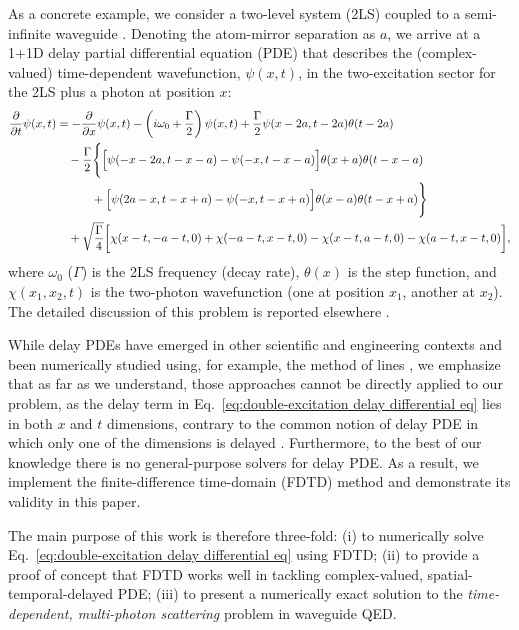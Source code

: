 \documentclass[12pt,letter,onecolumn,notitlepage]{article}
\begin{document}
As a concrete example, we consider a two-level system (2LS) coupled to a semi-infinite waveguide \cite{FangPRA15, FangNM17}. Denoting the atom-mirror separation as $a$, we arrive at a 1+1D delay partial differential equation (PDE) that describes the (complex-valued) time-dependent wavefunction, $\psi(x,t)$, in the two-excitation sector for the 2LS plus a photon at position $x$:
\begin{align}
\frac{\partial}{\partial t}\psi(x,t)&=-\frac{\partial}{\partial x}\psi(x,t)-\left(i\omega_0+\frac{\Gamma}{2}\right)\psi(x,t)+\frac{\Gamma}{2}\psi(x-2a, t-2a)\theta(t-2a)  \label{eq:double-excitation delay differential eq}\\
&\quad- \frac{\Gamma}{2}\Biggl\{\Bigl[\psi(- x- 2a, t- x- a) - \psi(- x, t- x- a)\Bigr]\theta(x+a)\theta(t- x- a)\nonumber\\
&\quad\quad\quad +\Bigl[\psi(2a- x, t- x+ a)- \psi(- x, t- x+a)\Bigr]\theta(x- a)\theta(t- x+ a)\Biggr\} \nonumber\\
&\quad+\sqrt{\frac{\Gamma}{4}}\biggl[\chi(x-t,-a-t,0)+\chi(-a-t,x-t,0)-\chi(x-t,a-t,0)-\chi(a-t,x-t,0)\biggr]\nonumber,
\end{align}
where $\omega_0$ ($\Gamma$) is the 2LS frequency (decay rate), $\theta(x)$ is the step function, and $\chi(x_1, x_2,t )$ is the two-photon wavefunction (one at position $x_1$, another at $x_2$). The detailed discussion of this problem is reported elsewhere \cite{FangNM17}.

While delay PDEs have emerged in other scientific and engineering contexts and been numerically studied using, for example, the method of lines \cite{Zubik_Kowal_Sch08}, we emphasize that as far as we understand, those approaches cannot be directly applied to our problem, as the delay term in Eq.~\eqref{eq:double-excitation delay differential eq} lies in both $x$ and $t$ dimensions, contrary to the common notion of delay PDE in which only one of the dimensions is delayed \cite{Zubik_Kowal_Sch08}. Furthermore, to the best of our knowledge there is no general-purpose solvers for delay PDE. As a result, we implement the finite-difference time-domain (FDTD) method and demonstrate its validity in this paper.  

The main purpose of this work is therefore three-fold: (i) to numerically solve Eq.~\eqref{eq:double-excitation delay differential eq} using FDTD; (ii) to provide a proof of concept that FDTD works well in tackling complex-valued, spatial-temporal-delayed PDE; (iii)  to present a numerically exact solution to the \textit{time-dependent, multi-photon scattering} problem in waveguide QED.
\end{document}
